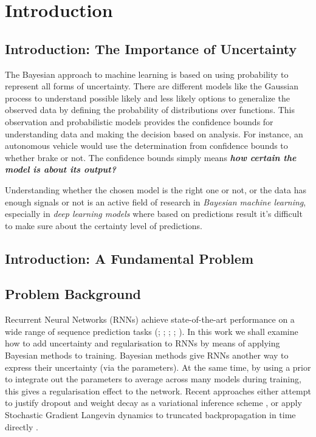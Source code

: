 \chapter{Introduction}
\label{chap:intro}

\section{Introduction: The Importance of Uncertainty}

The Bayesian approach to machine learning is based on using probability to represent all forms of uncertainty. There are different models like the Gaussian process to understand possible likely and less likely options to generalize the observed data by defining the probability of distributions over functions. This observation and probabilistic models provides the confidence bounds for understanding data and making the decision based on analysis. For instance, an autonomous vehicle would use the determination from confidence bounds to whether brake or not. The confidence bounds simply means \textbf{\textit{how certain the model is about its output?}}

Understanding whether the chosen model is the right one or not, or the data has enough signals or not is an active field of research \cite{Ghahramani2015} in \textit{Bayesian machine learning}, especially in \textit{deep learning models} where based on predictions result it's difficult to make sure about the certainty level of predictions.  

\section{Introduction: A Fundamental Problem}




\section{Problem Background}

Recurrent Neural Networks (RNNs) achieve state-of-the-art performance on a wide range of sequence prediction tasks (\cite{Wu2016}; \cite{Amodei2015}; \cite{Jozefowicz2016}; \cite{Zaremba2014}; \cite{Lu2016}).
In this work we shall examine how to add uncertainty and regularisation to RNNs by means of applying Bayesian methods to training.
Bayesian methods give RNNs another way to express their uncertainty (via the parameters).
At the same time, by using a prior to integrate out the parameters to average across many models during training, this gives a regularisation effect to the network.
Recent approaches either attempt to justify dropout \cite{Srivastava2014} and weight decay as a variational inference scheme \cite{Gal2015}, or apply Stochastic Gradient Langevin dynamics \cite{Welling2011} to truncated backpropagation in time directly \cite{Gan2016}.

